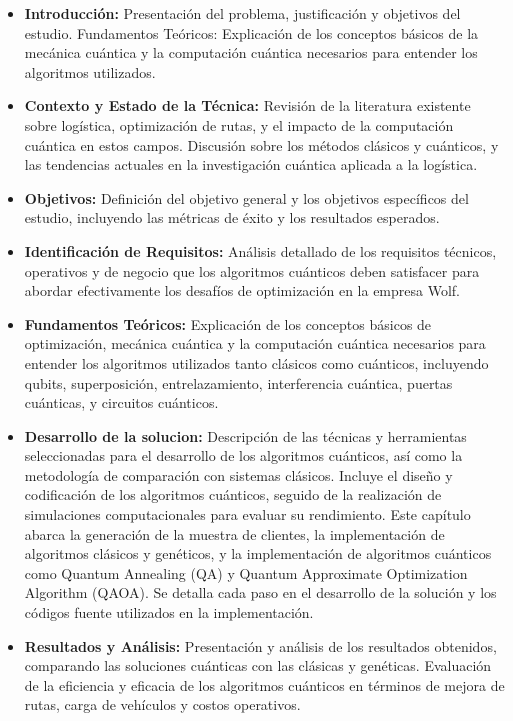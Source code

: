\documentclass[11pt,a4paper,spanish]{book}
\begin{document}
    \begin{itemize}
    \item \textbf{Introducción:} Presentación del problema, justificación y objetivos del estudio.
    Fundamentos Teóricos: Explicación de los conceptos básicos de la mecánica cuántica y la computación cuántica necesarios para entender los algoritmos utilizados.
	
	\item \textbf{Contexto y Estado de la Técnica:} Revisión de la literatura existente sobre logística, optimización de rutas, y el impacto de la computación cuántica en estos campos. Discusión sobre los métodos clásicos y cuánticos, y las tendencias actuales en la investigación cuántica aplicada a la logística.
	
	\item \textbf{Objetivos:} Definición del objetivo general y los objetivos específicos del estudio, incluyendo las métricas de éxito y los resultados esperados.
	
	\item \textbf{Identificación de Requisitos:} Análisis detallado de los requisitos técnicos, operativos y de negocio que los algoritmos cuánticos deben satisfacer para abordar efectivamente los desafíos de optimización en la empresa Wolf.
	
	\item \textbf{Fundamentos Teóricos:} Explicación de los conceptos básicos de optimización, mecánica cuántica y la computación cuántica necesarios para entender los algoritmos utilizados tanto clásicos como cuánticos, incluyendo qubits, superposición, entrelazamiento, interferencia cuántica, puertas cuánticas, y circuitos cuánticos.
	
	\item \textbf{Desarrollo de la solucion:} Descripción de las técnicas y herramientas seleccionadas para el desarrollo de los algoritmos cuánticos, así como la metodología de comparación con sistemas clásicos. Incluye el diseño y codificación de los algoritmos cuánticos, seguido de la realización de simulaciones computacionales para evaluar su rendimiento. Este capítulo abarca la generación de la muestra de clientes, la implementación de algoritmos clásicos y genéticos, y la implementación de algoritmos cuánticos como Quantum Annealing (QA) y Quantum Approximate Optimization Algorithm (QAOA). Se detalla cada paso en el desarrollo de la solución y los códigos fuente utilizados en la implementación.
		
	\item \textbf{Resultados y Análisis:} Presentación y análisis de los resultados obtenidos, comparando las soluciones cuánticas con las clásicas y genéticas. Evaluación de la eficiencia y eficacia de los algoritmos cuánticos en términos de mejora de rutas, carga de vehículos y costos operativos.
	

\end{itemize}
\end{document}
